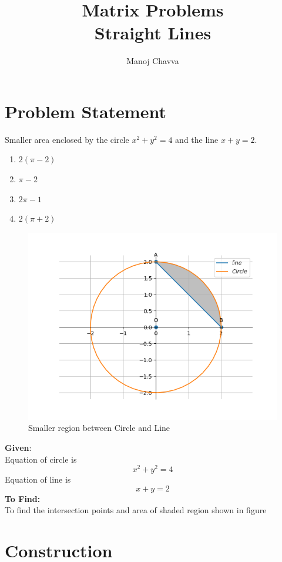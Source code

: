 \documentclass[journal,12pt,twocolumn]{IEEEtran}
\title{Matrix Problems \textbf{\\Straight Lines }}
\author{Manoj Chavva}
\begin{document}
\maketitle
\section{Problem Statement}

\noindent Smaller area enclosed by the circle $x^2 + y^2 = 4$ and the line $x + y = 2$. 
\begin{enumerate}
\item $2(\pi -2)$
\item $\pi -2$
\item $2\pi -1$
\item $2(\pi +2)$
\end{enumerate}


\begin{figure}[h]
\includegraphics[width=1\columnwidth]{figs/conic.png}
\caption{Smaller region between Circle and Line}
\label{fig:conic}
\end{figure}

\raggedright \textbf{Given}: \\
Equation of circle is  
\begin{equation} x^2 + y^2 = 4
\end{equation}
Equation of line is 
\begin{equation}
x+y=2
\end{equation}
\textbf{To Find:} \\
To find the intersection points and area of shaded region shown in figure\
\section{Construction}
\end{document}
